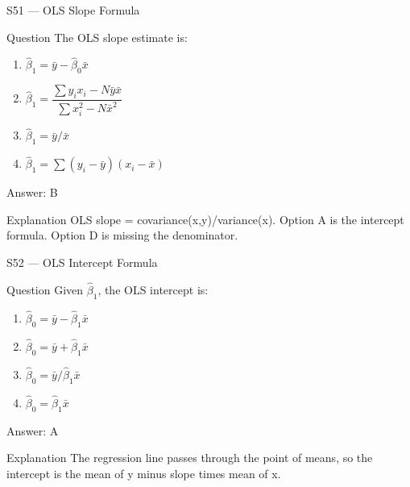 \documentclass[aspectratio=169,8pt]{beamer}
\begin{document}
	\begin{frame}{S51 --- OLS Slope Formula}
		\begin{block}{Question}
			The OLS slope estimate is:
			\begin{enumerate}
				\item $\hat{\beta}_1 = \bar{y} - \hat{\beta}_0 \bar{x}$
				\item $\hat{\beta}_1 = \dfrac{\sum y_i x_i - N\bar{y}\bar{x}}{\sum x_i^2 - N\bar{x}^2}$
				\item $\hat{\beta}_1 = \bar{y}/\bar{x}$
				\item $\hat{\beta}_1 = \sum(y_i - \bar{y})(x_i - \bar{x})$
			\end{enumerate}
		\end{block}
		\begin{exampleblock}{Answer: B}\end{exampleblock}
		\begin{block}{Explanation}
			OLS slope = covariance(x,y)/variance(x). Option A is the intercept formula. Option D is missing the denominator.
		\end{block}
	\end{frame}
	
	\begin{frame}{S52 --- OLS Intercept Formula}
		\begin{block}{Question}
			Given $\hat{\beta}_1$, the OLS intercept is:
			\begin{enumerate}
				\item $\hat{\beta}_0 = \bar{y} - \hat{\beta}_1 \bar{x}$
				\item $\hat{\beta}_0 = \bar{y} + \hat{\beta}_1 \bar{x}$
				\item $\hat{\beta}_0 = \bar{y}/\hat{\beta}_1 \bar{x}$
				\item $\hat{\beta}_0 = \hat{\beta}_1 \bar{x}$
			\end{enumerate}
		\end{block}
		\begin{exampleblock}{Answer: A}\end{exampleblock}
		\begin{block}{Explanation}
			The regression line passes through the point of means, so the intercept is the mean of y minus slope times mean of x.
		\end{block}
	\end{frame}
	
\end{document}
